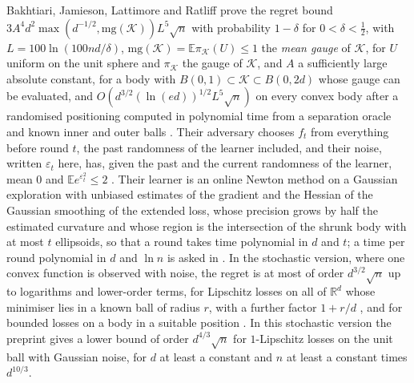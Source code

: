 \documentclass[11pt]{amsart}
\theoremstyle{definition}
\numberwithin{equation}{section}
\newcommand{\R}{\mathbb{R}}
\newcommand{\E}{\mathbb{E}}
\newcommand{\cK}{\mathcal{K}}
\begin{document}
Bakhtiari, Jamieson, Lattimore and Ratliff \cite[Theorem~2]{BJLR26} prove the regret bound $3A^4d^2\max(d^{-1/2},\mathrm{mg}(\cK))L^5\sqrt n$ with probability $1-\delta$ for $0<\delta<\frac12$, with $L=100\ln(100nd/\delta)$, $\mathrm{mg}(\cK)=\E\pi_\cK(U)\le1$ the \emph{mean gauge} of $\cK$, for $U$ uniform on the unit sphere and $\pi_\cK$ the gauge of $\cK$, and $A$ a sufficiently large absolute constant, for a body with $B(0,1)\subset\cK\subset B(0,2d)$ whose gauge can be evaluated, and $O(d^{3/2}(\ln(ed))^{1/2}L^5\sqrt n)$ on every convex body after a randomised positioning computed in polynomial time from a separation oracle and known inner and outer balls \cite[Section~4 and Proposition~13]{BJLR26}. Their adversary chooses $f_t$ from everything before round $t$, the past randomness of the learner included, and their noise, written $\varepsilon_t$ here, has, given the past and the current randomness of the learner, mean $0$ and $\E e^{\varepsilon_t^2}\le2$ \cite[Section~3]{BJLR26}. Their learner is an online Newton method on a Gaussian exploration with unbiased estimates of the gradient and the Hessian of the Gaussian smoothing of the extended loss, whose precision grows by half the estimated curvature and whose region is the intersection of the shrunk body with at most $t$ ellipsoids, so that a round takes time polynomial in $d$ and $t$; a time per round polynomial in $d$ and $\ln n$ is asked in \cite[Section~6]{BJLR26}. In the stochastic version, where one convex function is observed with noise, the regret is at most of order $d^{3/2}\sqrt n$ up to logarithms and lower-order terms, for Lipschitz losses on all of $\R^d$ whose minimiser lies in a known ball of radius $r$, with a further factor $1+r/d$ \cite[Theorem~1]{LG23}, and for bounded losses on a body in a suitable position \cite[Theorem~2]{FHLM24}.
In this stochastic version the preprint \cite[Theorem~1.2]{RH26} gives a lower bound of order $d^{4/3}\sqrt n$ for $1$-Lipschitz losses on the unit ball with Gaussian noise, for $d$ at least a constant and $n$ at least a constant times $d^{10/3}$.
\end{document}
